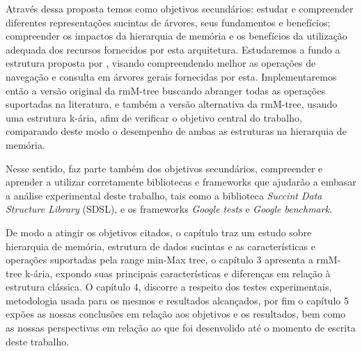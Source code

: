 Através dessa proposta temos como objetivos secundários: estudar e compreender diferentes representações sucintas de árvores, 
seus fundamentos e benefícios; compreender os impactos da hierarquia de memória e os benefícios da utilização
adequada dos recursos fornecidos por esta arquitetura. 
Estudaremos a fundo a estrutura proposta por 
\citeauthor{paper-fully-functinal-succint-trees}, visando compreendendo melhor as operações de navegação e consulta em árvores gerais fornecidas por esta.
Implementaremos então a versão original da rmM-tree buscando abranger todas as operações suportadas na literatura, e também a versão alternativa
da rmM-tree, usando uma estrutura k-ária, afim de verificar o objetivo central do trabalho, comparando deste modo o desempenho de ambas as estruturas na hierarquia
de memória. 

Nesse sentido, faz parte também dos objetivos secundários,
compreender e aprender a utilizar corretamente bibliotecas e frameworks que ajudarão a embasar a análise experimental deste trabalho, tais como a biblioteca \textit{Succint Data Structure Library} (SDSL),
e os frameworks \textit{Google tests} e \textit{Google benchmark}.

De modo a atingir os objetivos citados, o capítulo traz um estudo sobre hierarquia de memória, estrutura de dados sucintas e as características e operações suportadas pela
range min-Max tree, o capítulo 3 apresenta a rmM-tree k-ária, expondo suas principais características e diferenças em relação à estrutura clássica. O capítulo 4, 
discorre a respeito dos testes experimentais, metodologia usada para os mesmos e resultados alcançados, por fim o capítulo 5 expões as nossas conclusões em relação 
aos objetivos e os resultados, bem como as nossas perspectivas em relação ao que foi desenvolido até o momento de escrita deste trabalho.


